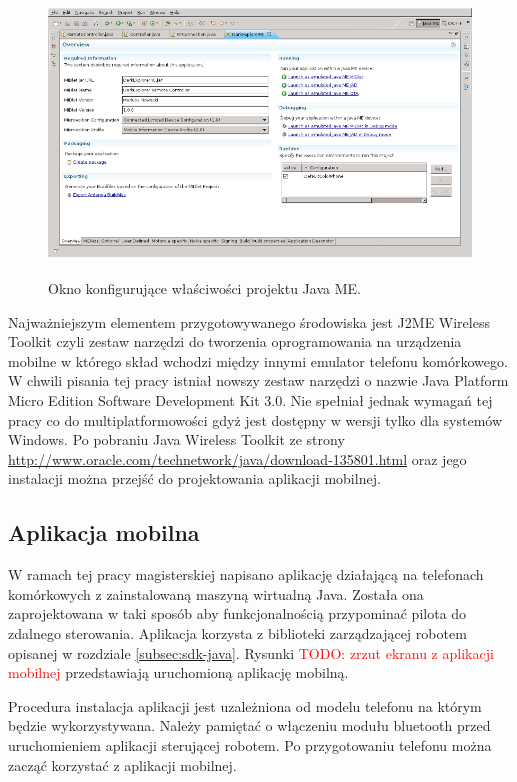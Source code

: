 \begin{figure}[!ht]
 \centering
 \includegraphics[height=75mm]{../images/ch05/mobile_tools_4_j.png}
 \caption{Okno konfigurujące właściwości projektu Java ME.}
 \label{fig:MobTools4J}
\end{figure}

Najważniejszym elementem przygotowywanego środowiska jest J2ME Wireless Toolkit czyli zestaw narzędzi do tworzenia oprogramowania na urządzenia mobilne w którego skład wchodzi między innymi emulator telefonu komórkowego. W chwili pisania tej pracy istniał nowszy zestaw narzędzi o nazwie Java Platform Micro Edition Software Development Kit 3.0. Nie spełniał jednak wymagań tej pracy co do multiplatformowości gdyż jest dostępny w wersji tylko dla systemów Windows. Po pobraniu Java Wireless Toolkit ze strony \url{http://www.oracle.com/technetwork/java/download-135801.html} oraz jego instalacji można przejść do projektowania aplikacji mobilnej.

\subsection{Aplikacja mobilna}
W ramach tej pracy magisterskiej napisano aplikację działającą na telefonach komórkowych z zainstalowaną maszyną wirtualną Java. Została ona zaprojektowana w taki sposób aby funkcjonalnością przypominać pilota do zdalnego sterowania. Aplikacja korzysta z biblioteki zarządzającej robotem opisanej w rozdziale \ref{subsec:sdk-java}. Rysunki \textcolor{red}{TODO: zrzut ekranu z aplikacji mobilnej} przedstawiają uruchomioną aplikację mobilną.

Procedura instalacja aplikacji jest uzależniona od modelu telefonu na którym będzie wykorzystywana. Należy pamiętać o włączeniu modułu bluetooth przed uruchomieniem aplikacji sterującej robotem. Po przygotowaniu telefonu można zacząć korzystać z aplikacji mobilnej.